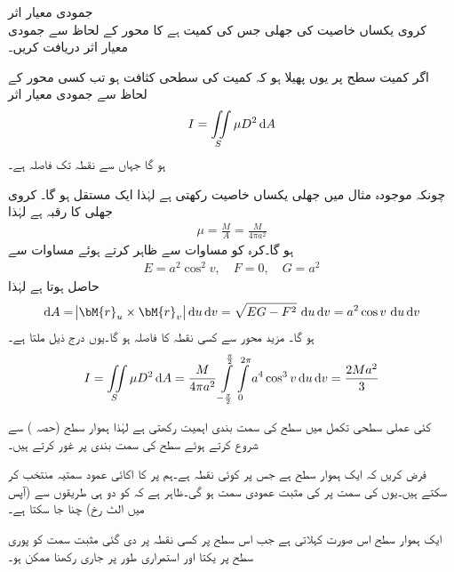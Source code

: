 \quad جمودی معیار اثر\\
کروی یکساں خاصیت کی جھلی  جس کی کمیت  ہے کا محور  کے لحاظ سے جمودی معیار اثر دریافت کریں۔

اگر کمیت سطح  پر یوں پھیلا ہو کہ کمیت کی سطحی کثافت  ہو تب کسی محور  کے لحاظ سے جمودی معیار اثر
\begin{align}
I=\iint\limits_S \mu D^2\dif A
\end{align}
ہو گا جہاں   سے نقطہ  تک فاصلہ  ہے۔

چونکہ موجودہ مثال میں جھلی یکساں خاصیت رکھتی ہے لہٰذا  ایک مستقل ہو گا۔ کروی جھلی کا رقبہ  ہے لہٰذا
\begin{align*}
\mu=\frac{M}{A}=\frac{M}{4\pi a^2}
\end{align*}
ہو گا۔کرہ کو مساوات  سے ظاہر کرتے ہوئے مساوات  سے
\begin{align*}
E=a^2\cos^2 v,\quad F=0,\quad G=a^2
\end{align*}
حاصل ہوتا ہے لہٰذا
\begin{align*}
\dif A=\abs{\bM{r}_u\times \bM{r}_v}\dif u\dif v=\sqrt{EG-F^2}\,\dif u\dif v=a^2\cos v\,\dif u\dif v
\end{align*}
ہو گا۔ مزید محور  سے کسی نقطہ  کا فاصلہ  ہو گا۔یوں درج ذیل ملتا ہے۔
\begin{align*}
I=\iint\limits_S \mu D^2 \dif A=\frac{M}{4\pi a^2}\int\limits_{-\frac{\pi}{2}}^{\frac{\pi}{2}} \int\limits_{0}^{2\pi} a^4\cos^3 v \dif u\dif v=\frac{2Ma^2}{3}
\end{align*}

کئی عملی سطحی تکمل میں سطح کی سمت بندی اہمیت رکھتی ہے لہٰذا ہموار سطح (حصہ ) سے شروع کرتے ہوئے  سطح کی سمت بندی پر غور کرتے ہیں۔

فرض کریں کہ  ایک ہموار سطح ہے جس پر  کوئی نقطہ ہے۔ہم  پر  کا اکائی عمود سمتیہ  منتخب کر سکتے ہیں۔یوں  کی سمت  پر  کی مثبت عمودی سمت  ہو گی۔ظاہر ہے کہ  کو دو ہی  طریقوں سے (آپس میں الٹ رخ) چنا جا سکتا ہے۔  

ایک ہموار سطح اس صورت  کہلاتی ہے جب اس سطح پر کسی نقطہ  پر دی  گئی مثبت سمت کو پوری سطح پر یکتا اور استمراری طور پر جاری رکھنا ممکن ہو۔

